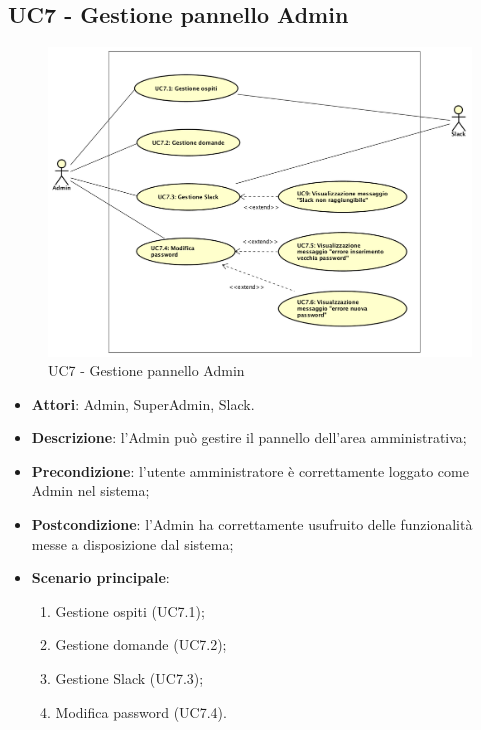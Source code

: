 \documentclass[../AnalisiDeiRequisiti_v3.0.0.tex]{subfiles}
\begin{document}
\subsection{UC7 - Gestione pannello Admin} 
\label{sssec:UC7} 
\begin{figure}[!h]
	\centering
	\includegraphics[width=\textwidth]{UseCases/UC7_GestionePannelloAdmin/UC7_GestionePannelloAdmin.png}
	\caption{UC7 - Gestione pannello Admin}
\end{figure}
\begin{itemize} 
\item \textbf{Attori}: Admin, SuperAdmin, Slack.
\item \textbf{Descrizione}: l'Admin può gestire il pannello dell'area amministrativa;
\item \textbf{Precondizione}: l'utente amministratore è correttamente loggato come Admin nel sistema;
\item \textbf{Postcondizione}: l'Admin ha correttamente usufruito delle funzionalità messe a disposizione dal sistema;
\item \textbf{Scenario principale}: \begin{enumerate}\item Gestione ospiti (UC7.1);\item Gestione domande (UC7.2);\item Gestione Slack (UC7.3);\item Modifica password (UC7.4). 
 \end{enumerate}
\end{itemize} 
\newpage
\end{document}
